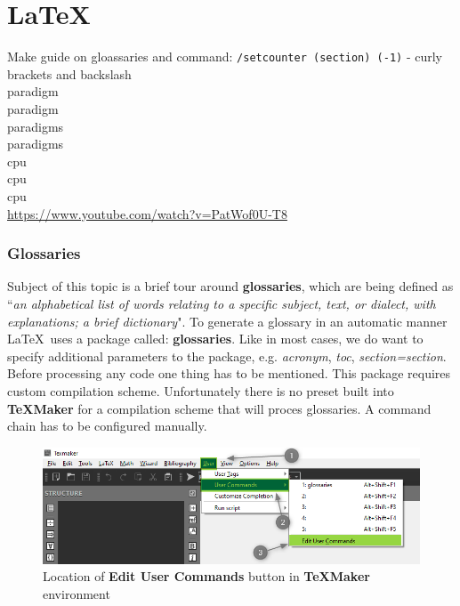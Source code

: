 \part{\LaTeX}

Make guide on gloassaries and command:  \texttt{/setcounter (section) (-1)} - curly brackets and backslash\\
\Gls{paradigm}\\
\gls{paradigm}\\
\Glspl{paradigm}\\
\glspl{paradigm}\\
\acrshort{cpu}\\
\acrlong{cpu}\\
\acrfull{cpu}\\
\url{https://www.youtube.com/watch?v=PatWof0U-T8}

\section{Glossaries}

Subject of this topic is a brief tour around \textbf{glossaries}, which are being defined as ``\textit{an alphabetical list of words relating to a specific subject, text, or dialect, with explanations; a brief dictionary}". To generate a glossary in an automatic manner \LaTeX\ uses a package called: \textbf{glossaries}. Like in most cases, we do want to specify additional parameters to the package, e.g. \textit{acronym}, \textit{toc}, \textit{section=section}.\\

Before processing any code one thing has to be mentioned. This package requires custom compilation scheme. Unfortunately there is no preset built into \textbf{TeXMaker} for a compilation scheme that will proces glossaries. A command chain has to be configured manually.

\begin{figure}[H]
\centering
\includegraphics[scale=0.6]{LaTeX/figures/user_command_glossaries_marked.png}
\caption{Location of \textbf{Edit User Commands} button in \textbf{TeXMaker} environment}
\end{figure}

